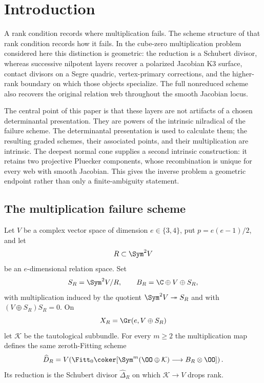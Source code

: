 \section{Introduction}
\label{sec:introduction-v132}

A rank condition records where multiplication fails.  The scheme
structure of that rank condition records how it fails.  In the
cube-zero multiplication problem considered here this distinction is
geometric: the reduction is a Schubert divisor, whereas successive
nilpotent layers recover a polarized Jacobian K3 surface, contact
divisors on a Segre quadric, vertex-primary corrections, and the
higher-rank boundary on which those objects specialize.  The full
nonreduced scheme also recovers the original relation web throughout the smooth Jacobian locus.

The central point of this paper is that these layers are not artifacts
of a chosen determinantal presentation.  They are powers of the
intrinsic nilradical of the failure scheme.  The determinantal
presentation is used to calculate them; the resulting graded schemes,
their associated points, and their multiplication are intrinsic.
The deepest normal cone supplies a second intrinsic construction: it
retains two projective Pluecker components, whose recombination is
unique for every web with smooth Jacobian.  This gives the inverse problem a geometric
endpoint rather than only a finite-ambiguity statement.

\subsection{The multiplication failure scheme}

Let \(V\) be a complex vector space of dimension
\(e\in\{3,4\}\), put \(p=e(e-1)/2\), and let
\[
 R\subset\Sym^2V
\]
be an \(e\)-dimensional relation space.  Set
\[
 S_R=\Sym^2V/R,\qquad
 B_R=\C\oplus V\oplus S_R,
\]
with multiplication induced by the quotient
\(\Sym^2V\twoheadrightarrow S_R\) and with
\((V\oplus S_R)S_R=0\).  On
\[
 X_R=\Gr(e,V\oplus S_R)
\]
let \(\mathcal K\) be the tautological subbundle.  For every
\(m\ge2\) the multiplication map defines the same zeroth-Fitting
scheme
\begin{equation}\label{eq:failure-intro}
 \widehat D_R=
 V\!\left(
 \Fitt_0\coker[
 \Sym^m(\OO\oplus\mathcal K)\longrightarrow
 B_R\otimes\OO]\right).
\end{equation}
Its reduction is the Schubert divisor
\(\widehat\Delta_R\) on which \(\mathcal K\to V\) drops rank.

